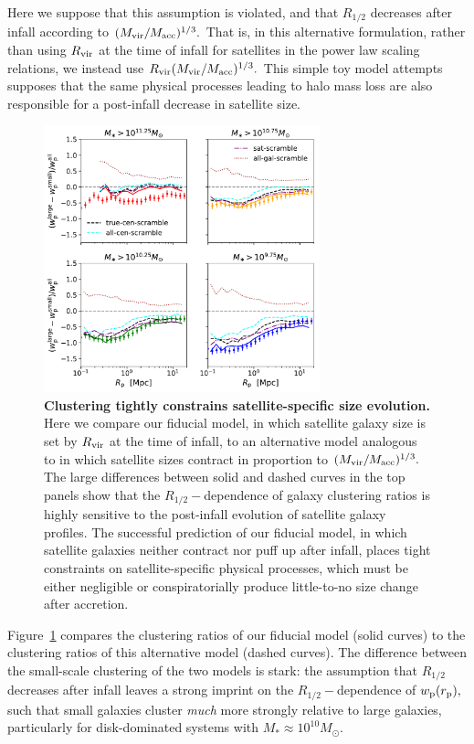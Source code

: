 \documentclass[usenatbib,usegraphicx,letterpaper]{mn2e}
\newcommand{\rhalf}{R_{1/2}}
\newcommand{\mstar}{M_{\ast}}
\newcommand{\mvir}{M_{\rm vir}}
\newcommand{\macc}{M_{\rm acc}}
\newcommand{\rvir}{R_{\rm vir}}
\newcommand{\rproj}{r_{\rm p}}
\newcommand{\wproj}{w_{\rm p}}
\newcommand{\msun}{M_\odot}
\begin{document}
Here we suppose that this assumption is violated, and that $\rhalf$ decreases after infall according to $(\mvir/\macc)^{1/3}.$ That is, in this alternative formulation, rather than using $\rvir$ at the time of infall for satellites in the power law scaling relations, we instead use $\rvir(\mvir/\macc)^{1/3}.$ This simple toy model attempts supposes that the same physical processes leading to halo mass loss are also responsible for a post-infall decrease in satellite size.

\begin{figure}
\centering
\includegraphics[width=8cm]{FIGS/scrambled_size_clustering_ratios.pdf}
\caption{
{\bf Clustering tightly constrains satellite-specific size evolution.}
Here we compare our fiducial model, in which satellite galaxy size is set by $\rvir$ at the time of infall, to an alternative model analogous to \citet{watson_etal12} in which satellite sizes contract in proportion to $(\mvir/\macc)^{1/3}.$ The large differences between solid and dashed curves in the top panels show that the $\rhalf-$dependence of galaxy clustering ratios is highly sensitive to the post-infall evolution of satellite galaxy profiles. The successful prediction of our fiducial model, in which satellite galaxies neither contract nor puff up after infall, places tight constraints on satellite-specific physical processes, which must be either negligible or conspiratorially produce little-to-no size change after accretion.
}
\label{fig:satellites}
\end{figure}

Figure~\ref{fig:satellites} compares the clustering ratios of our fiducial model (solid curves) to the clustering ratios of this alternative model (dashed curves). The difference between the small-scale clustering of the two models is stark: the assumption that $\rhalf$ decreases after infall leaves a strong imprint on the $\rhalf-$dependence of $\wproj(\rproj),$ such that small galaxies cluster {\em much} more strongly relative to large galaxies, particularly for disk-dominated systems with $\mstar\approx10^{10}\msun.$
\end{document}
